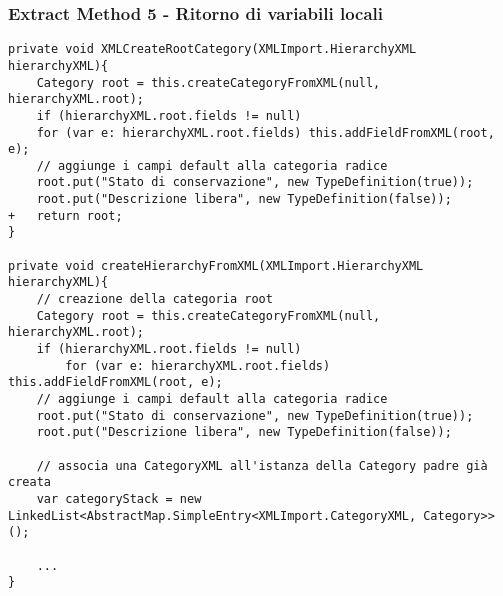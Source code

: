 \disablefooter%
\begin{frame}[fragile]
    \frametitle{Extract Method 5 - Ritorno di variabili locali}
    \begin{lstlisting}[language=tiny_diff]
private void XMLCreateRootCategory(XMLImport.HierarchyXML hierarchyXML){
    Category root = this.createCategoryFromXML(null, hierarchyXML.root);
    if (hierarchyXML.root.fields != null)
    for (var e: hierarchyXML.root.fields) this.addFieldFromXML(root, e);
    // aggiunge i campi default alla categoria radice
    root.put("Stato di conservazione", new TypeDefinition(true));
    root.put("Descrizione libera", new TypeDefinition(false));
+   return root;
}

private void createHierarchyFromXML(XMLImport.HierarchyXML hierarchyXML){
    // creazione della categoria root
    Category root = this.createCategoryFromXML(null, hierarchyXML.root);
    if (hierarchyXML.root.fields != null)
        for (var e: hierarchyXML.root.fields) this.addFieldFromXML(root, e);
    // aggiunge i campi default alla categoria radice
    root.put("Stato di conservazione", new TypeDefinition(true));
    root.put("Descrizione libera", new TypeDefinition(false));

    // associa una CategoryXML all'istanza della Category padre già creata
    var categoryStack = new LinkedList<AbstractMap.SimpleEntry<XMLImport.CategoryXML, Category>>();

    ...
}
\end{lstlisting}
\end{frame}
\enablefooter%

